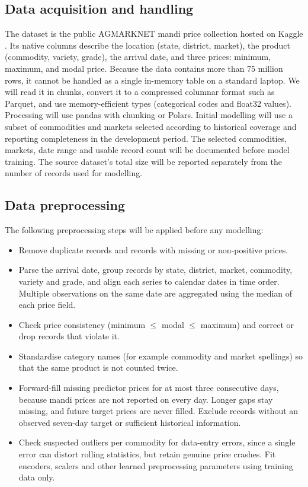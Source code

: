 \documentclass[12pt,a4paper]{article}
\begin{document}
\subsection{Data acquisition and handling}
The dataset is the public AGMARKNET mandi price collection hosted on Kaggle \cite{khandelwal2026daily}. Its native columns describe the location (state, district, market), the product (commodity, variety, grade), the arrival date, and three prices: minimum, maximum, and modal price. Because the data contains more than 75 million rows, it cannot be handled as a single in-memory table on a standard laptop. We will read it in chunks, convert it to a compressed columnar format such as Parquet, and use memory-efficient types (categorical codes and float32 values). Processing will use pandas with chunking or Polars. Initial modelling will use a subset of commodities and markets selected according to historical coverage and reporting completeness in the development period. The selected commodities, markets, date range and usable record count will be documented before model training. The source dataset's total size will be reported separately from the number of records used for modelling.

\subsection{Data preprocessing}
The following preprocessing steps will be applied before any modelling:
\begin{itemize}
    \item Remove duplicate records and records with missing or non-positive prices.
    \item Parse the arrival date, group records by state, district, market, commodity, variety and grade, and align each series to calendar dates in time order. Multiple observations on the same date are aggregated using the median of each price field.
    \item Check price consistency (minimum $\leq$ modal $\leq$ maximum) and correct or drop records that violate it.
    \item Standardise category names (for example commodity and market spellings) so that the same product is not counted twice.
    \item Forward-fill missing predictor prices for at most three consecutive days, because mandi prices are not reported on every day. Longer gaps stay missing, and future target prices are never filled. Exclude records without an observed seven-day target or sufficient historical information.
    \item Check suspected outliers per commodity for data-entry errors, since a single error can distort rolling statistics, but retain genuine price crashes. Fit encoders, scalers and other learned preprocessing parameters using training data only.
\end{itemize}
\end{document}
